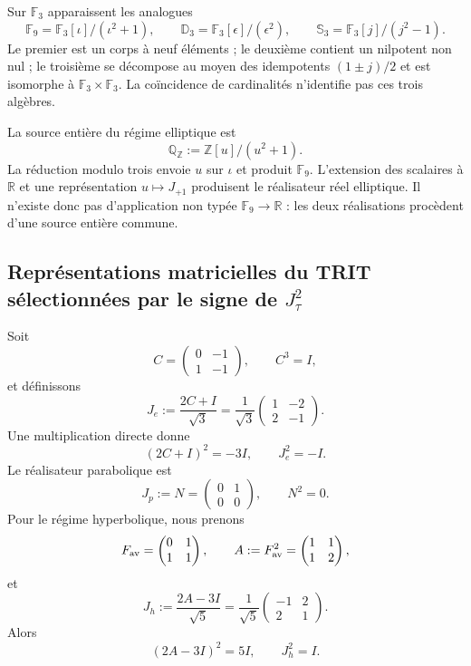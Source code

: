 Sur \(\mathbb F_3\) apparaissent les analogues
\[
 \mathbb F_9=\mathbb F_3[\iota]/(\iota^2+1),
 \qquad
 \mathbb D_3=\mathbb F_3[\epsilon]/(\epsilon^2),
 \qquad
 \mathbb S_3=\mathbb F_3[j]/(j^2-1).
\]
Le premier est un corps à neuf éléments ; le deuxième contient un nilpotent
non nul ; le troisième se décompose au moyen des idempotents
\((1\pm j)/2\) et est isomorphe à \(\mathbb F_3\times\mathbb F_3\). La
coïncidence de cardinalités n’identifie pas ces trois algèbres.

La source entière du régime elliptique est
\[
 \mathbb Q_{\mathbb Z}:=\mathbb Z[u]/(u^2+1).
\]
La réduction modulo trois envoie \(u\) sur \(\iota\) et produit
\(\mathbb F_9\). L’extension des scalaires à \(\mathbb R\) et une
représentation \(u\mapsto J_{+1}\) produisent le réalisateur réel elliptique.
Il n’existe donc pas d’application non typée \(\mathbb F_9\to\mathbb R\) : les deux
réalisations procèdent d’une source entière commune.

\subsection{Représentations matricielles du TRIT sélectionnées par le signe de \(J_\tau^2\)}

Soit
\[
 C=\begin{pmatrix}0&-1\\1&-1\end{pmatrix},
 \qquad C^3=I,
\]
et définissons
\[
 J_e:=\frac{2C+I}{\sqrt3}
 =\frac1{\sqrt3}\begin{pmatrix}1&-2\\2&-1\end{pmatrix}.
\]
Une multiplication directe donne
\[
 (2C+I)^2=-3I,
 \qquad J_e^2=-I.
\]
Le réalisateur parabolique est
\[
 J_p:=N=\begin{pmatrix}0&1\\0&0\end{pmatrix},
 \qquad N^2=0.
\]
Pour le régime hyperbolique, nous prenons
\[
 F_{\rm av}=\begin{pmatrix}0&1\\1&1\end{pmatrix},
 \qquad
 A:=F_{\rm av}^2=\begin{pmatrix}1&1\\1&2\end{pmatrix},
\]
et
\[
 J_h:=\frac{2A-3I}{\sqrt5}
 =\frac1{\sqrt5}\begin{pmatrix}-1&2\\2&1\end{pmatrix}.
\]
Alors
\[
 (2A-3I)^2=5I,
 \qquad J_h^2=I.
\]

